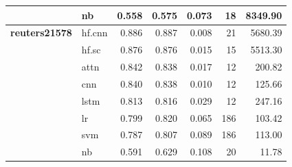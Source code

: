 \documentclass[final]{clv2025-revised}
\begin{document}
\begin{table}[h!]
{\begin{tabular}{@{}p{2cm}p{1.2cm}rrrrr@{}}
 & nb & 0.558 & 0.575 & 0.073 & 18 & 8349.90 \\
\midrule
\textbf{reuters21578} & hf.cnn & 0.886 & 0.887 & 0.008 & 21 & 5680.39 \\
 & hf.sc & 0.876 & 0.876 & 0.015 & 15 & 5513.30 \\
 & attn & 0.842 & 0.838 & 0.017 & 12 & 200.82 \\
 & cnn & 0.840 & 0.838 & 0.010 & 12 & 125.66 \\
 & lstm & 0.813 & 0.816 & 0.029 & 12 & 247.16 \\
 & lr & 0.799 & 0.820 & 0.065 & 186 & 103.42 \\
 & svm & 0.787 & 0.807 & 0.089 & 186 & 113.00 \\
 & nb & 0.591 & 0.629 & 0.108 & 20 & 11.78 \\
\bottomrule
\end{tabular}%
}
\end{table}
\end{document}
